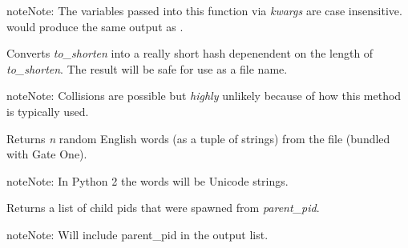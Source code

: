 \documentclass[letterpaper,10pt,openany]{sphinxmanual}
\begin{document}
\begin{fulllineitems}
\begin{notice}{note}{Note:}
The variables passed into this function via \emph{kwargs} are case
insensitive.   would produce the same
output as .
\end{notice}

\end{fulllineitems}


\begin{fulllineitems}
\label{Developer/utils:gateone.core.utils.short_hash}
Converts \emph{to\_shorten} into a really short hash depenendent on the length of
\emph{to\_shorten}.  The result will be safe for use as a file name.

\begin{notice}{note}{Note:}
Collisions are possible but \emph{highly} unlikely because of how this method
is typically used.
\end{notice}

\end{fulllineitems}


\begin{fulllineitems}
\label{Developer/utils:gateone.core.utils.random_words}
Returns \emph{n} random English words (as a tuple of strings) from the
 file (bundled with Gate One).

\begin{notice}{note}{Note:}
In Python 2 the words will be Unicode strings.
\end{notice}

\end{fulllineitems}


\begin{fulllineitems}
\label{Developer/utils:gateone.core.utils.get_process_tree}
Returns a list of child pids that were spawned from \emph{parent\_pid}.

\begin{notice}{note}{Note:}
Will include parent\_pid in the output list.
\end{notice}

\end{fulllineitems}
\end{document}
